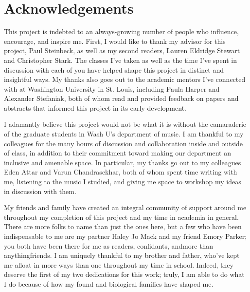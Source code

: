\documentclass[12pt]{report}
\begin{document}
\thispagestyle{empty}

\frenchspacing


\setcounter{page}{2}
    \tableofcontents
    \listoffigures
    \listoftables

    \chapter*{Acknowledgements}

This project is indebted to an always-growing number of people who influence, encourage, 
and inspire me. First, I would like to thank my advisor for this project, Paul Steinbeck, 
as well as my second readers, Lauren Eldridge Stewart and Christopher Stark. The classes 
I've taken as well as the time I've spent in discussion with each of you have helped shape
this project in distinct and insightful ways. My thanks also goes out to the academic 
mentors I've connected with at Washington University in St. Louis, including Paula Harper 
and Alexander Stefaniak, both of whom read and provided feedback on papers and abstracts
that informed this project in its early development.
 
I adamantly believe this project would not be what it is without the camaraderie of the 
graduate students in Wash U's department of music. I am thankful to my colleagues for the 
many hours of discussion and collaboration inside and outside of class, in addition to their 
commitment toward making our department an inclusive and amenable space. In particular, my
thanks go out to my colleagues Eden Attar and Varun Chandrasekhar, both of whom spent time 
writing with me, listening  to the music I studied, and giving me space to workshop my 
ideas in discussion with them.

My friends and family have created an integral community of support around me throughout my 
completion of this project and my time in academia in general. There are more folks to name 
than just the ones here, but a few who have been indispensable to me are my partner Haley 
Jo Mack and my friend Emory Parker; you both have been there for me as readers, confidants, 
and\textemdash more than anything\textemdash friends. I am uniquely thankful to my brother 
and father, who've kept me afloat in more ways than one throughout my time in school. Indeed,
they deserve the first of my two dedications for this work; truly, I am able to do what I do
because of how my found and biological families have shaped me.
\end{document}
